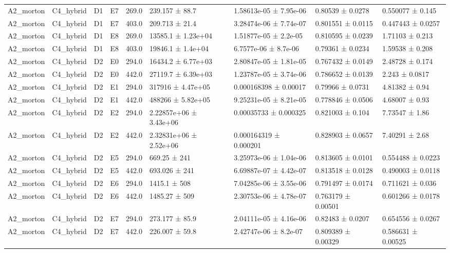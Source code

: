 \begin{table}
\begin{tabular}{lllllllll}
A2\_morton & C4\_hybrid & D1 & E7 & 269.0 & 239.157 ± 88.7 & 1.58613e-05 ± 7.95e-06 & 0.80539 ± 0.0278 & 0.550077 ± 0.145 \\
A2\_morton & C4\_hybrid & D1 & E7 & 403.0 & 209.713 ± 21.4 & 3.28474e-06 ± 7.74e-07 & 0.801551 ± 0.0115 & 0.447443 ± 0.0257 \\
A2\_morton & C4\_hybrid & D1 & E8 & 269.0 & 13585.1 ± 1.23e+04 & 1.51877e-05 ± 2.2e-05 & 0.810595 ± 0.0239 & 1.71103 ± 0.213 \\
A2\_morton & C4\_hybrid & D1 & E8 & 403.0 & 19846.1 ± 1.4e+04 & 6.7577e-06 ± 8.7e-06 & 0.79361 ± 0.0234 & 1.59538 ± 0.208 \\
A2\_morton & C4\_hybrid & D2 & E0 & 294.0 & 16434.2 ± 6.77e+03 & 2.80847e-05 ± 1.81e-05 & 0.767432 ± 0.0149 & 2.48728 ± 0.174 \\
A2\_morton & C4\_hybrid & D2 & E0 & 442.0 & 27119.7 ± 6.39e+03 & 1.23787e-05 ± 3.74e-06 & 0.786652 ± 0.0139 & 2.243 ± 0.0817 \\
A2\_morton & C4\_hybrid & D2 & E1 & 294.0 & 317916 ± 4.47e+05 & 0.000168398 ± 0.00017 & 0.79966 ± 0.0731 & 4.81382 ± 0.94 \\
A2\_morton & C4\_hybrid & D2 & E1 & 442.0 & 488266 ± 5.82e+05 & 9.25231e-05 ± 8.21e-05 & 0.778846 ± 0.0506 & 4.68007 ± 0.93 \\
A2\_morton & C4\_hybrid & D2 & E2 & 294.0 & 2.22857e+06 ± 3.43e+06 & 0.00035733 ± 0.000325 & 0.821003 ± 0.104 & 7.73547 ± 1.86 \\
A2\_morton & C4\_hybrid & D2 & E2 & 442.0 & 2.32831e+06 ± 2.52e+06 & 0.000164319 ± 0.000201 & 0.828903 ± 0.0657 & 7.40291 ± 2.68 \\
A2\_morton & C4\_hybrid & D2 & E5 & 294.0 & 669.25 ± 241 & 3.25973e-06 ± 1.04e-06 & 0.813605 ± 0.0101 & 0.554488 ± 0.0223 \\
A2\_morton & C4\_hybrid & D2 & E5 & 442.0 & 693.026 ± 241 & 6.69887e-07 ± 4.42e-07 & 0.813518 ± 0.0128 & 0.490003 ± 0.0118 \\
A2\_morton & C4\_hybrid & D2 & E6 & 294.0 & 1415.1 ± 508 & 7.04285e-06 ± 3.55e-06 & 0.791497 ± 0.0174 & 0.711621 ± 0.036 \\
A2\_morton & C4\_hybrid & D2 & E6 & 442.0 & 1485.27 ± 509 & 2.30753e-06 ± 4.78e-07 & 0.763179 ± 0.00501 & 0.601266 ± 0.0178 \\
A2\_morton & C4\_hybrid & D2 & E7 & 294.0 & 273.177 ± 85.9 & 2.04111e-05 ± 4.16e-06 & 0.82483 ± 0.0207 & 0.654556 ± 0.0267 \\
A2\_morton & C4\_hybrid & D2 & E7 & 442.0 & 226.007 ± 59.8 & 2.42747e-06 ± 8.2e-07 & 0.809389 ± 0.00329 & 0.586631 ± 0.00525 \\

\end{tabular}
\end{table}
